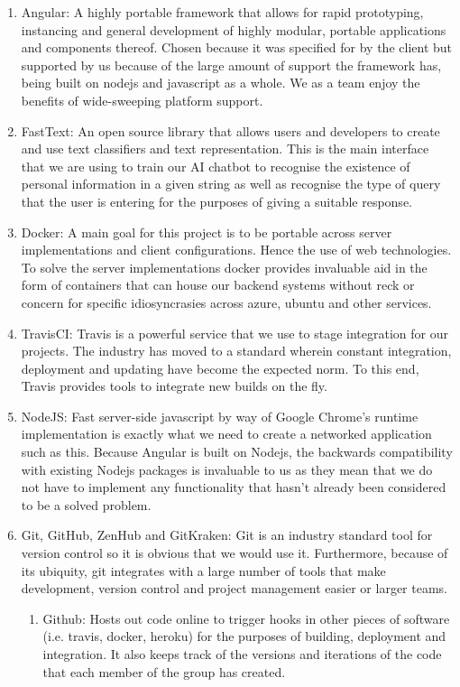 \documentclass[11pt]{article}
\begin{document}
\begin{enumerate}
	\item Angular: A highly portable framework that allows for rapid prototyping, instancing and general development of highly modular, portable applications and components thereof. Chosen because it was specified for by the client but supported by us because of the large amount of support the framework has, being built on nodejs and javascript as a whole. We as a team enjoy the benefits of wide-sweeping platform support.
	\item FastText: An open source library that allows users and developers to create and use text classifiers and text representation. This is the main interface that we are using to train our AI chatbot to recognise the existence of personal information in a given string as well as recognise the type of query that the user is entering for the purposes of giving a suitable response.
	\item Docker: A main goal for this project is to be portable across server implementations and client configurations. Hence the use of web technologies. To solve the server implementations docker provides invaluable aid in the form of containers that can house our backend systems without reck or concern for specific idiosyncrasies across azure, ubuntu and other services. 
	\item TravisCI: Travis is a powerful service that we use to stage integration for our projects. The industry has moved to a standard wherein constant integration, deployment and updating have become the expected norm. To this end, Travis provides tools to integrate new builds on the fly.
	\item NodeJS: Fast server-side javascript by way of Google Chrome’s runtime implementation is exactly what we need to create a networked application such as this. Because Angular is built on Nodejs, the backwards compatibility with existing Nodejs packages is invaluable to us as they mean that we do not have to implement any functionality that hasn’t already been considered to be a solved problem.
	\item Git, GitHub, ZenHub and GitKraken: Git is an industry standard tool for version control so it is obvious that we would use it. Furthermore, because of its ubiquity, git integrates with a large number of tools that make development, version control and project management easier or larger teams.
	\begin{enumerate}
		\item Github: Hosts out code online to trigger hooks in other pieces of software (i.e. travis, docker, heroku) for the purposes of building, deployment and integration. It also keeps track of the versions and iterations of the code that each member of the group has created.

\end{enumerate}
\end{enumerate}
\end{document}
